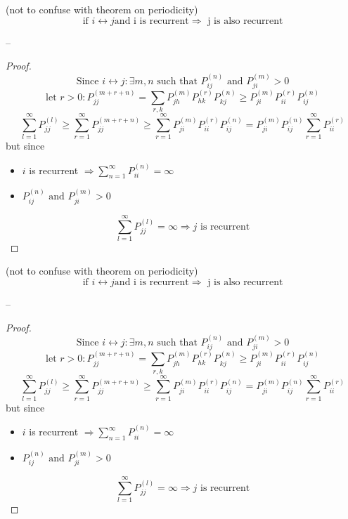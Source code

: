 \begin{theorem}
(not to confuse with theorem on periodicity)
$$\mbox{if } i\leftrightarrow j \mbox{and i is recurrent} \Rightarrow \mbox{ j is also recurrent}$$
\end{theorem}
--
\begin{proof}
$$\mbox{Since } i\leftrightarrow j : \exists m,n \mbox{ such that } P_{ij}^{(n)} \mbox{ and } P_{ji}^{(m)} > 0$$
$$\mbox{let } r>0 : P_{jj}^{(m+r+n)} = \sum_{r, k} P_{jh}^{(m)} P_{hk}^{(r)} P_{kj}^{(n)} \geq P_{ji}^{(m)}  P_{ii}^{(r)}  P_{ij}^{(n)}$$
$$\sum_{l=1}^\infty P_{jj}^{(l)} \geq \sum_{r=1}^\infty P_{jj}^{(m+r+n)} \geq \sum_{r=1}^\infty P_{ji}^{(m)}  P_{ii}^{(r)}  P_{ij}^{(n)} = P_{ji}^{(m)} P_{ij}^{(n)} \sum_{r=1}^\infty P_{ii}^{(r)}$$
but since \begin{itemize}
\item$i$ is recurrent $\Rightarrow \sum_{n=1}^\infty P_{ii}^{(n)} = \infty$
\item $P_{ij}^{(n)} \mbox{ and } P_{ji}^{(m)} > 0$
\end{itemize}
$$\sum_{l=1}^\infty P_{jj}^{(l)} = \infty \Rightarrow j \mbox{ is recurrent}$$

\end{proof}



\begin{theorem}
(not to confuse with theorem on periodicity)
$$\mbox{if } i\leftrightarrow j \mbox{and i is recurrent} \Rightarrow \mbox{ j is also recurrent}$$
\end{theorem}
--
\begin{proof}
$$\mbox{Since } i\leftrightarrow j : \exists m,n \mbox{ such that } P_{ij}^{(n)} \mbox{ and } P_{ji}^{(m)} > 0$$
$$\mbox{let } r>0 : P_{jj}^{(m+r+n)} = \sum_{r, k} P_{jh}^{(m)} P_{hk}^{(r)} P_{kj}^{(n)} \geq P_{ji}^{(m)}  P_{ii}^{(r)}  P_{ij}^{(n)}$$
$$\sum_{l=1}^\infty P_{jj}^{(l)} \geq \sum_{r=1}^\infty P_{jj}^{(m+r+n)} \geq \sum_{r=1}^\infty P_{ji}^{(m)}  P_{ii}^{(r)}  P_{ij}^{(n)} = P_{ji}^{(m)} P_{ij}^{(n)} \sum_{r=1}^\infty P_{ii}^{(r)}$$
but since \begin{itemize}
\item$i$ is recurrent $\Rightarrow \sum_{n=1}^\infty P_{ii}^{(n)} = \infty$
\item $P_{ij}^{(n)} \mbox{ and } P_{ji}^{(m)} > 0$
\end{itemize}
$$\sum_{l=1}^\infty P_{jj}^{(l)} = \infty \Rightarrow j \mbox{ is recurrent}$$

\end{proof}

